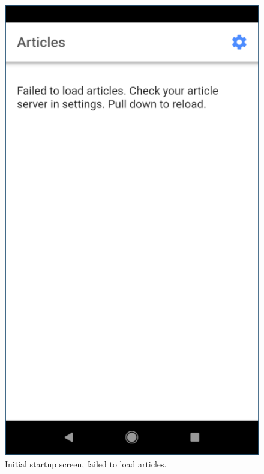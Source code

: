 \documentclass[12pt]{report}
\begin{document}
\begin{figure}
    \centering
    \includegraphics[scale=0.5]{images/avd-no-articles.png}
    \caption{Initial startup screen, failed to load articles.}
    \label{fig:avd-no-articles}
\end{figure}
\end{document}
